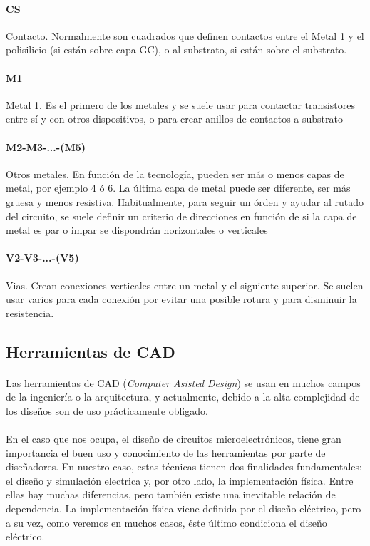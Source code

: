 \paragraph{CS}
Contacto. Normalmente son cuadrados que definen contactos entre el Metal 1 y el
polisilicio (si están sobre capa GC), o al substrato, si están sobre el substrato.

\paragraph{M1} Metal 1. Es el primero de los metales y se suele usar para contactar
transistores entre sí y con otros dispositivos, o para crear anillos de contactos
a substrato

\paragraph{M2-M3-...-(M5)} Otros metales. En función de la tecnología, pueden ser
más o menos capas de metal, por ejemplo 4 ó 6. La última capa de metal puede ser
diferente, ser más gruesa y menos resistiva. Habitualmente, para seguir un órden
y ayudar al rutado del circuito, se suele definir un criterio de direcciones
en función de si la capa de metal es par o impar se dispondrán horizontales o
verticales

\paragraph{V2-V3-...-(V5)} Vias. Crean conexiones verticales entre un metal y el
siguiente superior. Se suelen usar varios para cada conexión por evitar una
posible rotura y para disminuir la resistencia.

\subsection{Herramientas de CAD}

\paragraph{} Las herramientas de CAD (\textit{Computer Asisted Design}) se usan
en muchos campos de la ingeniería o la arquitectura, y actualmente, debido a la alta
complejidad de los diseños son de uso prácticamente obligado.

\paragraph{} En el caso que nos ocupa, el diseño de circuitos microelectrónicos,
tiene gran importancia el buen uso y conocimiento de las herramientas por parte de
diseñadores. En nuestro caso, estas técnicas tienen dos finalidades fundamentales:
el diseño y simulación electrica y, por otro lado, la implementación física. Entre ellas
hay muchas diferencias, pero también existe una inevitable relación de dependencia.
La implementación física viene definida por el diseño eléctrico, pero a su vez, como
veremos en muchos casos, éste último condiciona el diseño eléctrico.

